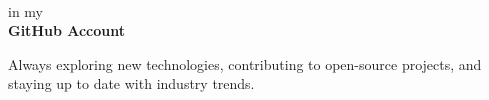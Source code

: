 \documentclass[10pt,A4]{article}
\begin{document}
\begin{minipage}{0.59\textwidth}
{		%
		\parbox[b][3cm][c]{4.6cm}{
			}
		
		\parbox[b][3cm][c]{3cm}{
			\begin{center}
			\\
			\textcolor{textcol}{in my}\\
			\textcolor{textcol}{\textbf{GitHub Account \\ \faGithub}}
			\end{center}
		}

		\parbox[b][3cm][c]{3.5cm}{
			\begin{center}
			\textcolor{textcol}{Always exploring new technologies, contributing to open-source projects, and staying up to date with industry trends.}
			\end{center}
		}
	}

\end{minipage}
\hspace{5pt}
\begin{minipage}{0.01\textwidth}
	\begin{center}
	\end{center}
\end{minipage}
\end{document}
